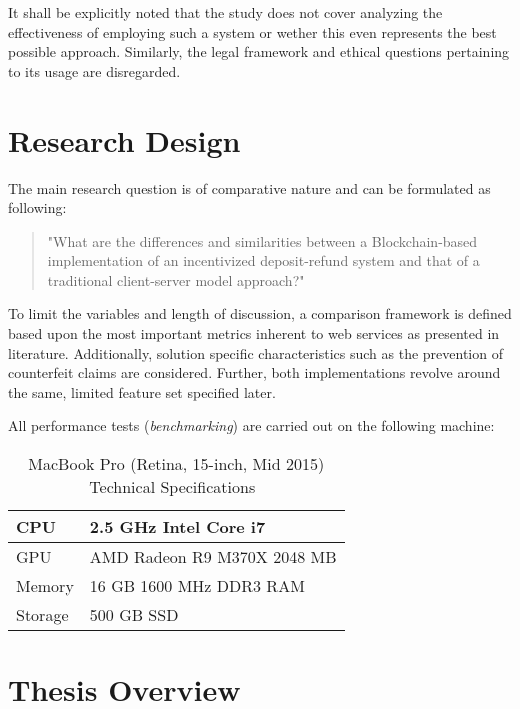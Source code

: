 It shall be explicitly noted that the study does not cover analyzing the effectiveness of employing such a system or wether this even represents the best possible approach. Similarly, the legal framework and ethical questions pertaining to its usage are disregarded.



\section{Research Design}
The main research question is of comparative nature and can be formulated as following: 

\begin{quote}
	"What are the differences and similarities between a Blockchain-based implementation of an incentivized deposit-refund system and that of a traditional client-server model approach?"
\end{quote}

To limit the variables and length of discussion, a comparison framework is defined based upon the most important metrics inherent to web services as presented in literature. Additionally, solution specific characteristics such as the prevention of counterfeit claims are considered. Further, both implementations revolve around the same, limited feature set specified later.

All performance tests (\textit{benchmarking}) are carried out on the following machine:

\begin{table}[hbt]
	\centering
	\begin{tabular}{l|l}
		CPU & 2.5 GHz Intel Core i7 \\
		\hline
		GPU & AMD Radeon R9 M370X 2048 MB \\
		\hline
		Memory & 16 GB 1600 MHz DDR3 RAM \\
		\hline
		Storage & 500 GB SSD \\
	\end{tabular}
	\caption{MacBook Pro (Retina, 15-inch, Mid 2015) Technical Specifications~\cite{macbookproSpecifications}}
\end{table}

\section{Thesis Overview}
